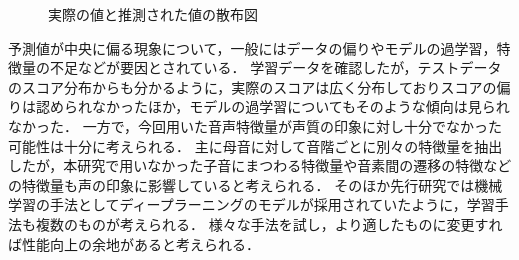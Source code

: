 \begin{figure}[htb]
  \hspace{3mm}
  \vspace{3mm}
  \caption{実際の値と推測された値の散布図}
  \label{fig:scatters}
\end{figure}

予測値が中央に偏る現象について，一般にはデータの偏りやモデルの過学習，特徴量の不足などが要因とされている．
学習データを確認したが，テストデータのスコア分布からも分かるように，実際のスコアは広く分布しておりスコアの偏りは認められなかったほか，モデルの過学習についてもそのような傾向は見られなかった．
一方で，今回用いた音声特徴量が声質の印象に対し十分でなかった可能性は十分に考えられる．
主に母音に対して音階ごとに別々の特徴量を抽出したが，本研究で用いなかった子音にまつわる特徴量や音素間の遷移の特徴などの特徴量も声の印象に影響していると考えられる．
そのほか先行研究\cite{dnn}では機械学習の手法としてディープラーニングのモデルが採用されていたように，学習手法も複数のものが考えられる．
様々な手法を試し，より適したものに変更すれば性能向上の余地があると考えられる．

